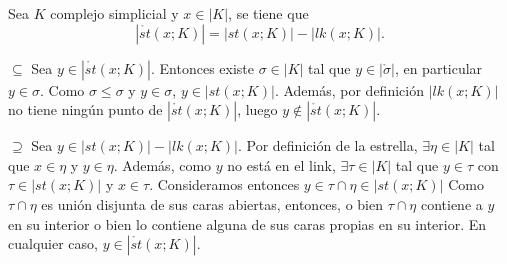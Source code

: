 \documentclass[HS.tex]{subfiles}
\begin{document}
\begin{prop}
Sea $K$ complejo simplicial y $x\in|K|$, se tiene que
\[
|\mathring{st}(x;K)|=|st(x;K)|-|lk(x;K)|.
\]
\end{prop}
\begin{dem}
$\boxed{\subseteq}$ Sea $y\in |\mathring{st}(x;K)|$. Entonces existe $\sigma\in |K|$ tal que $y\in|\mathring{\sigma}|$, en particular $y\in\sigma$. Como $\sigma\leq\sigma$ y $y\in\sigma$, $y\in |st(x;K)|$. Además, por definición $|lk(x;K)|$ no tiene ningún punto de $|\mathring{st}(x;K)|$, luego $y\notin|\mathring{st}(x;K)|$.

$\boxed{\supseteq}$ Sea $y\in |st(x;K)|-|lk(x;K)|$. Por definición de la estrella, $\exists\eta\in |K|$ tal que $x\in\eta$ y $y\in\eta$. Además, como $y$ no está en el link, $\exists \tau\in |K|$ tal que $y\in\tau$ con $\tau\in |st(x;K)|$ y $x\in\tau$. Consideramos entonces $y\in\tau\cap\eta\in |st(x;K)|$ Como $\tau\cap\eta$ es unión disjunta de sus caras abiertas, entonces, o bien $\tau\cap\eta$ contiene a $y$ en su interior o bien lo contiene alguna de sus caras propias en su interior. En cualquier caso, $y\in |\mathring{st}(x;K)|$.  \QED
\end{dem}
\end{document}
